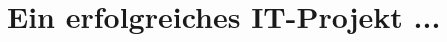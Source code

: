 \documentclass[12pt]{scrartcl}
\begin{document}
\newpage

\section{Ein erfolgreiches IT-Projekt ...}



 
\end{document}
